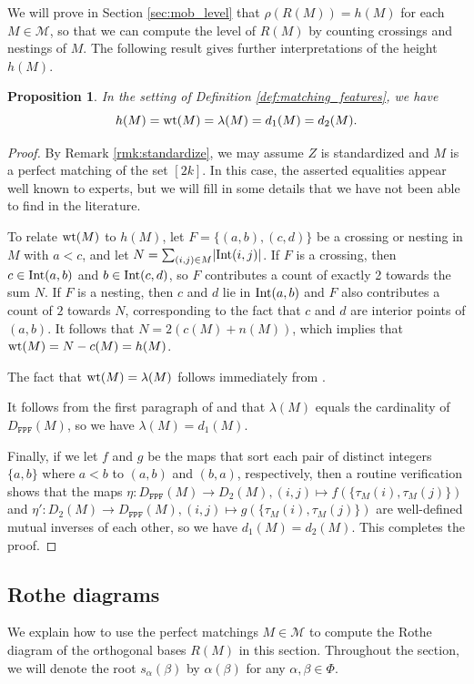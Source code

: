 \documentclass[11pt]{amsart}
\theoremstyle{plain}
\newtheorem{prop}[theorem]{Proposition}
\theoremstyle{definition}
\theoremstyle{remark}
\numberwithin{equation}{section}
\newcommand{\al}{\alpha}
\newcommand{\be}{\beta}
\newcommand{\ra}{\rightarrow}
\newcommand{\calm}{\mathcal{M}}
\DeclareMathOperator{\wt}{\rm{wt}}
\DeclareMathOperator{\interior}{\rm{Int}}
\newcommand{\abs}[1]{\lvert #1 \rvert}
\begin{document}
We will prove in Section \ref{sec:mob_level} that $\rho(R(M))=h(M)$ for each
$M\in \calm$, so that we can compute the level of $R(M)$ by counting crossings
and nestings of $M$. The following result gives further interpretations of the
height $h(M)$.

\begin{prop}
\label{prop:wt}
In the setting of Definition \ref{def:matching_features}, we have
\[
h(M)=\wt(M)=\lambda(M)=d_1(M)=d_2(M).
\]
\end{prop}

\begin{proof}
By Remark \ref{rmk:standardize}, we may assume $Z$ is standardized and $M$ is a
perfect matching of the set $[2k]$. In this case, the asserted equalities appear
well known to experts, but we will fill in some details that we have not been
able to find in the literature. 

To relate $\wt(M)$ to $h(M)$, let $F=\{(a,b), (c,d)\}$ be a crossing or nesting
in $M$ with $a<c$, and let $N=\sum_{(i,j)\in M}\abs{\interior(i,j)}$. If $F$ is
a crossing, then $c \in \interior(a,b)$ and $b\in \interior(c,d)$, so $F$
contributes a count of exactly 2 towards the sum $N$. If $F$ is a nesting, then
$c$ and $d$ lie in $\interior(a,b)$ and $F$ also contributes a count of $2$ towards
$N$, corresponding to the fact that $c$ and $d$ are interior points of $(a,b)$.
It follows that $N=2(c(M)+n(M))$, which implies that $\wt(M)=N-c(M)=h(M)$. 

The fact that $\wt(M)=\lambda(M)$ follows immediately from \cite[Proposition
9]{watson14}. 

It follows from the first paragraph of \cite[Section 3]{hamaker18} and
\cite[Proposition 3.6]{hamaker18} that $\lambda(M)$ equals the cardinality of
$D_\texttt{FPF}(M)$, so we have $\lambda(M)=d_1(M)$.

Finally, if we let $f$ and $g$ be the maps that sort each pair of distinct integers $\{a,b\}$ where $a<b$
to $(a,b)$ and $(b,a)$, respectively, then a routine
verification shows that the maps $\eta: D_\texttt{FPF}(M)\ra D_2(M), (i,j)\mapsto
f(\{\tau_M(i),\tau_M(j)\})$ and $\eta': D_2(M)\ra D_\texttt{FPF}(M), (i,j)\mapsto
g(\{\tau_M(i),\tau_M(j)\})$ are well-defined mutual inverses of each other, so
we have $d_1(M)=d_2(M)$. This completes the proof.
\end{proof}

\subsection{Rothe diagrams}
\label{sec:mob_res}
We explain how to use the perfect matchings $M\in \calm$ to compute the
Rothe diagram of the orthogonal bases $R(M)$ in this section.
Throughout the section, we will denote the root $s_\al(\be)$ by $\al(\be)$ for
any $\al,\be\in \Phi$.
\end{document}
